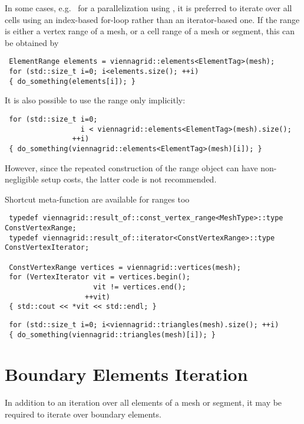 In some cases, e.g.~ for a parallelization using \OpenMP \cite{openmp}, it is preferred to iterate over all cells using an index-based for-loop rather than an iterator-based one.
If the range is either a vertex range of a mesh, or a cell range of a mesh or segment, this can be obtained by
\begin{lstlisting}
 ElementRange elements = viennagrid::elements<ElementTag>(mesh);
 for (std::size_t i=0; i<elements.size(); ++i)
 { do_something(elements[i]); }
\end{lstlisting}
It is also possible to use the range only implicitly:
\begin{lstlisting}
 for (std::size_t i=0;
                  i < viennagrid::elements<ElementTag>(mesh).size();
                ++i)
 { do_something(viennagrid::elements<ElementTag>(mesh)[i]); }
\end{lstlisting}
However, since the repeated construction of the range object can have non-negligible setup costs, the latter code is not recommended.


Shortcut meta-function are available for ranges too
\begin{lstlisting}
 typedef viennagrid::result_of::const_vertex_range<MeshType>::type   ConstVertexRange;
 typedef viennagrid::result_of::iterator<ConstVertexRange>::type         ConstVertexIterator;

 ConstVertexRange vertices = viennagrid::vertices(mesh);
 for (VertexIterator vit = vertices.begin();
                     vit != vertices.end();
                   ++vit)
 { std::cout << *vit << std::endl; }
\end{lstlisting}

\begin{lstlisting}
 for (std::size_t i=0; i<viennagrid::triangles(mesh).size(); ++i)
 { do_something(viennagrid::triangles(mesh)[i]); }
\end{lstlisting}

\section{Boundary Elements Iteration}
In addition to an iteration over all elements of a mesh or segment, it may be required to iterate over boundary elements.

